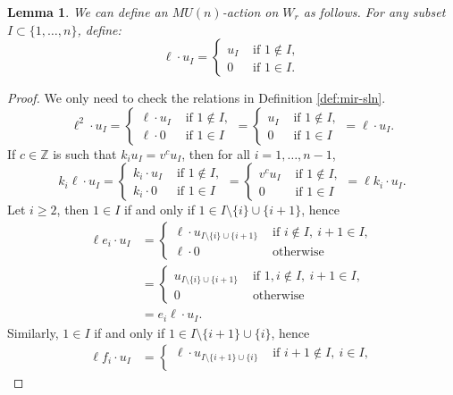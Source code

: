 \documentclass{amsart}
\numberwithin{equation}{section}
\theoremstyle{theorem}
\newtheorem{lemma}[theorem]{Lemma}
\theoremstyle{definition}
\newcommand{\ZZ}{\mathbb{Z}}
\begin{document}
\begin{lemma}
We can define an $MU(n)$-action on $W_r$ as follows. For any subset $I\subset\{1,\ldots,n\}$,
define:
\[\ell\cdot u_I=\begin{cases} u_I & \text{ if }1\not\in I,\\
0 & \text{ if }1\in I.   
\end{cases}\]
\end{lemma}
\begin{proof}
We only need to check the relations in Definition \ref{def:mir-sln}.
\[\ell^2\cdot u_I=\begin{cases} \ell\cdot u_I & \text{ if }1\not\in I,\\
\ell\cdot 0 & \text{ if }1\in I \end{cases}=\begin{cases} u_I & \text{ if }1\not\in I, \\
 0 & \text{ if }1\in I\end{cases}=\ell\cdot u_I.\]
 If $c\in \ZZ$ is such that $k_iu_I=v^c u_I$, then for all $i=1,\ldots,n-1$,
 \[k_i\ell\cdot u_I=\begin{cases} k_i\cdot u_I & \text{ if }1\not\in I,\\
k_i\cdot 0 & \text{ if }1\in I \end{cases}=\begin{cases} v^c u_I & \text{ if }1\not\in I,\\ 0 & \text{ if }1\in I\end{cases}=\ell k_i\cdot u_I.\]
Let $i\geq 2$, then $1\in I$ if and only if $1\in I\setminus \{i\}\cup\{i+1\}$, hence
\begin{align*}\ell e_i\cdot u_I&=\begin{cases} \ell \cdot u_{I\setminus \{i\}\cup\{i+1\}} & \text{ if }i\not\in I,~i+1\in I,\\
\ell\cdot 0 & \text{ otherwise } \end{cases} \\
& =\begin{cases} u_{I\setminus \{i\}\cup\{i+1\}} & \text{ if }1,i\not\in I,~i+1\in I, \\ 0 & \text{ otherwise }\end{cases} \\ 
&=e_i\ell\cdot u_I.\end{align*}
Similarly, $1\in I$ if and only if $1\in I\setminus \{i+1\}\cup\{i\}$, hence
\begin{align*}\ell f_i\cdot u_I&=\begin{cases} \ell\cdot u_{I\setminus \{i+1\}\cup\{i\}} & \text{ if }i+1\not\in I,~i\in I,\\

\end{cases}
\end{align*}
\end{proof}
\end{document}
